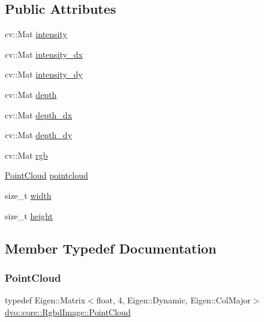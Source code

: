 \subsection*{Public Attributes}
\begin{DoxyCompactItemize}
\item 
cv\+::\+Mat \mbox{\hyperlink{structdvo_1_1core_1_1_rgbd_image_a4befb13808afd51c10b7ee945517d693}{intensity}}
\item 
cv\+::\+Mat \mbox{\hyperlink{structdvo_1_1core_1_1_rgbd_image_a912335c9c06c351275647cbec274febf}{intensity\+\_\+dx}}
\item 
cv\+::\+Mat \mbox{\hyperlink{structdvo_1_1core_1_1_rgbd_image_abf9856a4b48696a6ff80824be7815f1a}{intensity\+\_\+dy}}
\item 
cv\+::\+Mat \mbox{\hyperlink{structdvo_1_1core_1_1_rgbd_image_a95e43f3efef765278172153c02888d0a}{depth}}
\item 
cv\+::\+Mat \mbox{\hyperlink{structdvo_1_1core_1_1_rgbd_image_adaa7647076295d4ea71566f2ea156572}{depth\+\_\+dx}}
\item 
cv\+::\+Mat \mbox{\hyperlink{structdvo_1_1core_1_1_rgbd_image_acb9a7fe558cf86398e4677c5c2c7172a}{depth\+\_\+dy}}
\item 
cv\+::\+Mat \mbox{\hyperlink{structdvo_1_1core_1_1_rgbd_image_a43f8cdc199b3d219251a97591ab2f247}{rgb}}
\item 
\mbox{\hyperlink{structdvo_1_1core_1_1_rgbd_image_a56820965eb98427d06e6733fe333cdc5}{Point\+Cloud}} \mbox{\hyperlink{structdvo_1_1core_1_1_rgbd_image_a651ebb5170880695e4f31a7ca1377720}{pointcloud}}
\item 
size\+\_\+t \mbox{\hyperlink{structdvo_1_1core_1_1_rgbd_image_a8f247a04dfd8f7540fc14131fb86bd21}{width}}
\item 
size\+\_\+t \mbox{\hyperlink{structdvo_1_1core_1_1_rgbd_image_a793644aa6797d96ee61315bd5e4c7c32}{height}}
\end{DoxyCompactItemize}


\subsection{Member Typedef Documentation}
\mbox{\label{structdvo_1_1core_1_1_rgbd_image_a56820965eb98427d06e6733fe333cdc5}} 
\subsubsection{\texorpdfstring{Point\+Cloud}{PointCloud}}
{\footnotesize\ttfamily typedef Eigen\+::\+Matrix$<$float, 4, Eigen\+::\+Dynamic, Eigen\+::\+Col\+Major$>$ \mbox{\hyperlink{structdvo_1_1core_1_1_rgbd_image_a56820965eb98427d06e6733fe333cdc5}{dvo\+::core\+::\+Rgbd\+Image\+::\+Point\+Cloud}}}



